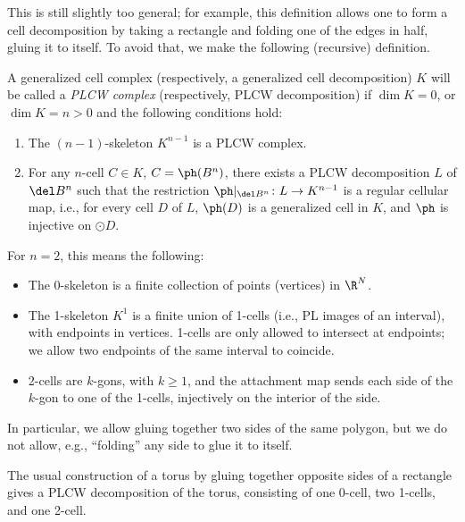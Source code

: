 This is still slightly too general; for example, this definition allows one
to form a cell decomposition by taking a rectangle and folding one of the
edges in half, gluing it to itself. To avoid that, we make the following
(recursive) definition.



\begin{definition}\label{d:PLCW}
  A generalized cell complex (respectively, a generalized cell
  decomposition) $K$ will be called a \emph{PLCW complex} (respectively, PLCW
  decomposition) if $\dim K=0$, or $\dim K=n>0$ and the following
  conditions hold:
  \begin{enumerate}
    \item The $(n-1)$-skeleton $K^{n-1}$ is a PLCW complex.
    \item For any $n$-cell $C\in K$, $C=\ph(B^n)$, there exists a PLCW
    decomposition $L$ of $\del B^n$ such that the restriction
    $\ph|_{\del B^n}\colon L\to K^{n-1}$ is a regular cellular map, i.e.,
    for every cell $D$ of $L$, $\ph(D)$ is a generalized cell in $K$, and
    $\ph$ is injective on $\odot{D}$.
  \end{enumerate}
\end{definition}

For $n=2$, this means the following:
\begin{itemize}
  \item The 0-skeleton is a finite collection of points (vertices) in $\R^N$.
  \item The 1-skeleton $K^1$ is a finite union of 1-cells (i.e., PL images of an
   interval), with endpoints in vertices. 1-cells are only allowed to
   intersect at endpoints; we allow two endpoints of the same interval
   to coincide.
  \item 2-cells are $k$-gons, with $k\ge 1$, and the attachment map sends each
   side of the $k$-gon to one of the 1-cells, injectively on the interior of the
   side.
\end{itemize}
In particular, we allow gluing together two sides of the same polygon, but
we do not allow, e.g., ``folding'' any side to glue it to itself.



\begin{example}\label{x:torus-plcw}
    The usual construction of a torus by gluing together opposite sides of a
    rectangle gives a PLCW decomposition of the torus, consisting of one 0-cell,
    two 1-cells, and one 2-cell.
\end{example}

